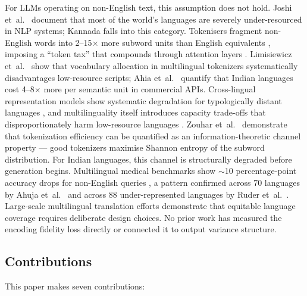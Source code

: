 \documentclass[11pt,a4paper]{article}
\begin{document}
For LLMs operating on non-English text, this assumption does not hold. Joshi et~al.\ \citep{joshi2020} document that most of the world's languages are severely under-resourced in NLP systems; Kannada falls into this category. Tokenisers fragment non-English words into 2--15$\times$ more subword units than English equivalents \citep{petrov2023,liang2025}, imposing a ``token tax'' that compounds through attention layers \citep{lundin2025}. Limisiewicz et~al.\ \citep{limisiewicz2023} show that vocabulary allocation in multilingual tokenizers systematically disadvantages low-resource scripts; Ahia et~al.\ \citep{ahia2023} quantify that Indian languages cost 4--8$\times$ more per semantic unit in commercial APIs. Cross-lingual representation models show systematic degradation for typologically distant languages \citep{pires2019,conneau2020}, and multilinguality itself introduces capacity trade-offs that disproportionately harm low-resource languages \citep{chang2024}. Zouhar et~al.\ \citep{zouhar2023} demonstrate that tokenization efficiency can be quantified as an information-theoretic channel property --- good tokenizers maximise Shannon entropy of the subword distribution. For Indian languages, this channel is structurally degraded before generation begins. Multilingual medical benchmarks show $\sim$10 percentage-point accuracy drops for non-English queries \citep{alonso2024}, a pattern confirmed across 70 languages by Ahuja et~al.\ \citep{ahuja2023} and across 88 under-represented languages by Ruder et~al.\ \citep{ruder2023}. Large-scale multilingual translation efforts \citep{nllb2022} demonstrate that equitable language coverage requires deliberate design choices. No prior work has measured the encoding fidelity loss directly or connected it to output variance structure.

\subsection{Contributions}

This paper makes seven contributions:
\end{document}
